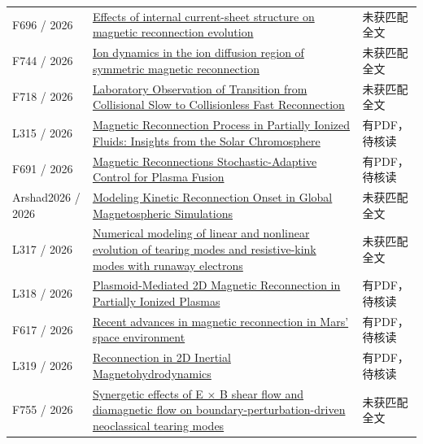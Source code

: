\begin{longtable}{P{24mm}P{97mm}P{27mm}}
F696 / 2026 & \href{https://doi.org/10.1088/2058-6272/ae78b7}{Effects of internal current-sheet structure on magnetic reconnection evolution} & 未获匹配全文\\

F744 / 2026 & \href{https://doi.org/10.1063/5.0347826}{Ion dynamics in the ion diffusion region of symmetric magnetic reconnection} & 未获匹配全文\\

F718 / 2026 & \href{https://doi.org/10.1103/9l36-74my}{Laboratory Observation of Transition from Collisional Slow to Collisionless Fast Reconnection} & 未获匹配全文\\

L315 / 2026 & \href{https://doi.org/10.1007/s11207-026-02714-1}{Magnetic Reconnection Process in Partially Ionized Fluids: Insights from the Solar Chromosphere} & 有PDF，待核读\\

F691 / 2026 & \href{https://doi.org/10.21203/rs.3.rs-8443380/v1}{Magnetic Reconnections Stochastic-Adaptive Control for Plasma Fusion} & 有PDF，待核读\\

Arshad2026 / 2026 & \href{https://doi.org/10.1029/2026ja035547}{Modeling Kinetic Reconnection Onset in Global Magnetospheric Simulations} & 未获匹配全文\\

L317 / 2026 & \href{https://doi.org/10.1088/1741-4326/ae4e49}{Numerical modeling of linear and nonlinear evolution of tearing modes and resistive-kink modes with runaway electrons} & 未获匹配全文\\

L318 / 2026 & \href{https://doi.org/10.13140/rg.2.2.22493.17125}{Plasmoid-Mediated 2D Magnetic Reconnection in Partially Ionized Plasmas} & 有PDF，待核读\\

F617 / 2026 & \href{https://doi.org/10.1007/s11038-026-09597-z}{Recent advances in magnetic reconnection in Mars’ space environment} & 有PDF，待核读\\

L319 / 2026 & \href{https://doi.org/10.48550/arxiv.2610.23494}{Reconnection in 2D Inertial Magnetohydrodynamics} & 有PDF，待核读\\

F755 / 2026 & \href{https://doi.org/10.1088/1741-4326/ae3332}{Synergetic effects of E × B shear flow and diamagnetic flow on boundary-perturbation-driven neoclassical tearing modes} & 未获匹配全文\\


\end{longtable}
